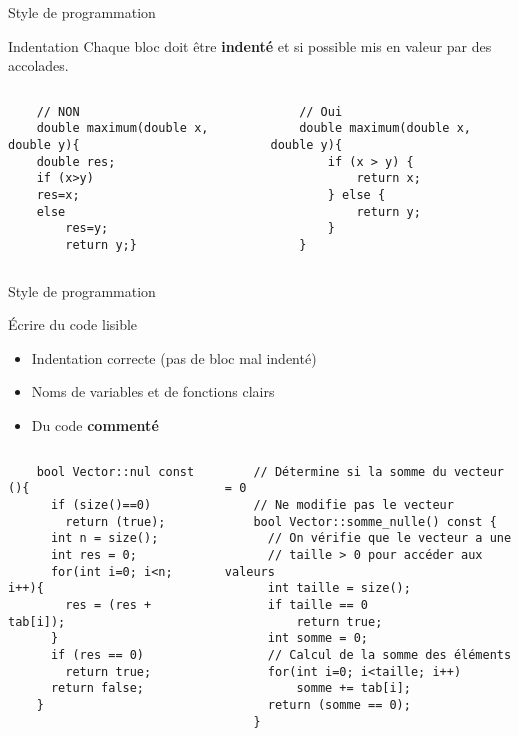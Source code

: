\begin{frame}[fragile]{Style de programmation}
\begin{block}{Indentation}
Chaque bloc doit être \textbf{indenté} et si possible mis en valeur par des accolades.
\end{block}

\begin{columns}
    \begin{column}{0.5\textwidth}
    \begin{verbatim}
    // NON
    double maximum(double x, double y){
    double res;
    if (x>y)
    res=x;
    else
        res=y;
        return y;}
    \end{verbatim}
    \end{column}
    \begin{column}{0.5\textwidth}
    \begin{verbatim}
    // Oui
    double maximum(double x, double y){
        if (x > y) {
            return x;
        } else {
            return y;
        }
    }
    \end{verbatim}
    \end{column}
\end{columns}
\end{frame}

\begin{frame}[fragile]{Style de programmation}

\begin{block}{Écrire du code lisible}
\begin{itemize}
    \item Indentation correcte (pas de bloc mal indenté)
    \item Noms de variables et de fonctions clairs
    \item Du code \textbf{commenté}
\end{itemize}
\end{block}

\begin{columns}
    \begin{column}{0.4\textwidth}
    \begin{verbatim}
    bool Vector::nul const (){
      if (size()==0)
        return (true);
      int n = size();
      int res = 0;
      for(int i=0; i<n; i++){
        res = (res + tab[i]);
      }
      if (res == 0)
        return true;
      return false;
    }
    \end{verbatim}
    \end{column}
    \begin{column}{0.6\textwidth}
    \begin{verbatim}
    // Détermine si la somme du vecteur = 0
    // Ne modifie pas le vecteur
    bool Vector::somme_nulle() const {
      // On vérifie que le vecteur a une
      // taille > 0 pour accéder aux valeurs
      int taille = size();
      if taille == 0
          return true;
      int somme = 0;
      // Calcul de la somme des éléments
      for(int i=0; i<taille; i++)
          somme += tab[i];
      return (somme == 0);
    }
    \end{verbatim}
    \end{column}
\end{columns}
\end{frame}


